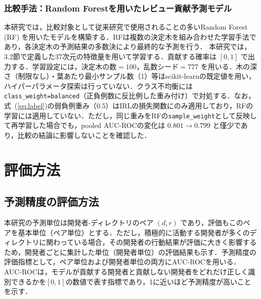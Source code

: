\documentclass[submit,noauthor,ses,dvipdfmx]{ipsj}
\newcommand{\fixstart}{\color{magenta}}
\newcommand{\fixend}{\color{black}}
\begin{document}
\subsubsection{比較手法：Random Forestを用いたレビュー貢献予測モデル}\label{sec:rf}
本研究では，比較対象として従来研究で使用されることの多いRandom Forest (RF) を用いたモデルを構築する．RFは複数の決定木を組み合わせた学習手法であり，各決定木の予測結果の多数決により最終的な予測を行う．
本研究では，3.2節で定義した37次元の特徴量を用いて学習する\cite{breiman_rf}．貢献する確率は $[0, 1]$ で出力する．学習設定には，決定木の数$= 100$，乱数シード$=777$ を用いる．\fixstart 木の深さ（制限なし）・葉あたり最小サンプル数（1）等はscikit-learnの既定値を用い，ハイパーパラメータ探索は行っていない．クラス不均衡には\texttt{class\_weight=balanced}（正負例数に反比例した重み付け）で対処する．なお，式~(\ref{eq:label})の弱負例重み（$0.5$）はIRLの損失関数にのみ適用しており，RFの学習には適用していない．ただし，同じ重みをRFの\texttt{sample\_weight}として反映して再学習した場合でも，pooled AUC-ROCの変化は $0.801 \to 0.799$ と僅少であり，比較の結論に影響しないことを確認した．\fixend

\section{評価方法}\label{sec:evaluation}

\subsection{予測精度の評価方法}
本研究の予測単位は開発者-ディレクトリのペア $(d, r)$ であり，評価もこのペアを基本単位（ペア単位）とする．ただし，積極的に活動する開発者が多くのディレクトリに関わっている場合，その開発者の行動結果が評価に大きく影響するため，開発者ごとに集計した単位（開発者単位）の評価結果も示す．予測精度の評価指標として，ペア単位および開発者単位の両方にAUC-ROCを用いる．AUC-ROCは，モデルが貢献する開発者と貢献しない開発者をどれだけ正しく識別できるかを$[0, 1]$の数値で表す指標であり，1に近いほど予測精度が高いことを示す．


\end{document}
